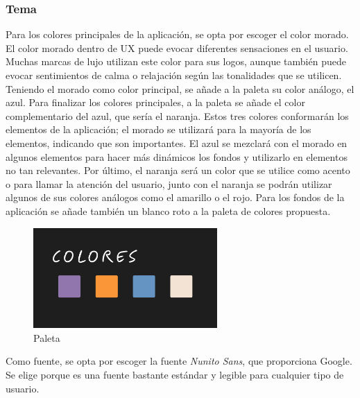 \documentclass[a4paper, 12pt]{article}
\begin{document}
\subsubsection{Tema}

Para los colores principales de la aplicación, se opta por escoger el color morado. El color morado dentro de UX puede evocar diferentes sensaciones en el usuario. Muchas marcas de lujo utilizan este color para sus logos, aunque también puede evocar sentimientos de calma o relajación según las tonalidades que se utilicen. Teniendo el morado como color principal, se añade a la paleta su color análogo, el azul. Para finalizar los colores principales, a la paleta se añade el color complementario del azul, que sería el naranja. Estos tres colores conformarán los elementos de la aplicación; el morado se utilizará para la mayoría de los elementos, indicando que son importantes. El azul se mezclará con el morado en algunos elementos para hacer más dinámicos los fondos y utilizarlo en elementos no tan relevantes. Por último, el naranja será un color que se utilice como acento o para llamar la atención del usuario, junto con el naranja se podrán utilizar algunos de sus colores análogos como el amarillo o el rojo. Para los fondos de la aplicación se añade también un blanco roto a la paleta de colores propuesta.

\begin{figure}[H]
	\begin{center}
		{\includegraphics[width=7cm]{design/Colors.jpg}\par}
		\caption{Paleta}
	\end{center}
\end{figure}

Como fuente, se opta por escoger la fuente \textit{Nunito Sans}, que proporciona Google. Se elige porque es una fuente bastante estándar y legible para cualquier tipo de usuario.
\end{document}
